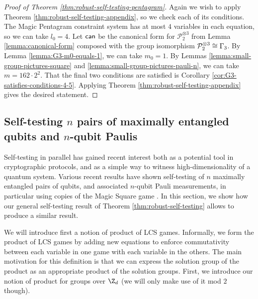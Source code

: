 \begin{proof}[Proof of Theorem \ref{thm:robust-self-testing-pentagram}]
Again we wish to apply Theorem \ref{thm:robust-self-testing-appendix}, so we check each of its conditions. The Magic Pentagram constraint system has at most $4$ variables in each equation, so we can take $l_0 = 4$. Let $\operatorname*{\mathsf{can}}$ be the canonical form for $\mathcal{P}_2^{\otimes 3}$ from Lemma \ref{lemma:canonical-form} composed with the group isomorphism $\mathcal{P}_2^{\otimes 3} \cong \Gamma_3$. By Lemma \ref{lemma:G3-m0-equals-1}, we can take $m_0 = 1$. By Lemmas \ref{lemma:small-group-pictures-square} and \ref{lemma:small-group-pictures-pauli-n}, we can take $m = 162\cdot 2^2$. That the final two conditions are satisfied is Corollary \ref{cor:G3-satisfies-conditions-4-5}. Applying Theorem \ref{thm:robust-self-testing-appendix} gives the desired statement.
\end{proof}


\subsection{Self-testing $n$ pairs of maximally entangled qubits and $n$-qubit Paulis}

Self-testing in parallel has gained recent interest both as a potential tool in cryptographic protocols, and as a simple way to witness high-dimensionality of a quantum system. Various recent results have shown self-testing of $n$ maximally entangled pairs of qubits, and associated $n$-qubit Pauli measurements, in particular using copies of the Magic Square game \cite{coladan17, CN16}. In this section, we show how our general self-testing result of Theorem \ref{thm:robust-self-testing} allows to produce a similar result.

We will introduce first a notion of product of LCS games. Informally, we form the product of LCS games by adding new equations to enforce commutativity between each variable in one game with each variable in the others. 
The main motivation for this definition is that we can express the solution group of the product as an appropriate product of the solution groups. First, we introduce our notion of product for groups over $\Z_d$ (we will only make use of it mod $2$ though).

